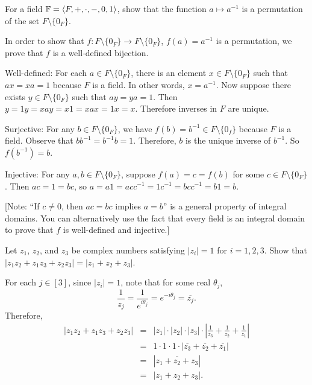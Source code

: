 \begin{problem}[Golan 12]
For a field $\mathbb{F} = \langle F,+,\cdot, -, 0, 1\rangle$, 
show that the function $a \mapsto a^{-1}$ is a 
permutation of the set $F \setminus \{0_F\}$.
\end{problem}
\smallskip
\begin{solution}

In order to show that $f:F\setminus \{0_F\}\rightarrow F\setminus \{0_F\}$, $f(a)=a^{-1}$ is a permutation, we prove that $f$ is a well-defined bijection. 

Well-defined: For each $a\in F\setminus \{0_F\}$, there is an element $x\in F\setminus \{0_F\}$ such that $ax=xa=1$ because $F$ is a field. In other words, $x=a^{-1}$. Now suppose there exists $y\in  F\setminus \{0_F\}$ such that $ay=ya=1$. Then $y = 1y = xay = x1 = xax = 1x = x$. Therefore inverses in $F$ are unique. 

Surjective: For any $b\in F\setminus \{0_F\}$, we have $f(b)=b^{-1}\in F\setminus \{0_f\}$ because $F$ is a field. Observe that $bb^{-1}=b^{-1}b=1$. Therefore, $b$ is the unique inverse of $b^{-1}$. So $f(b^{-1}) = b$. 

Injective: For any $a,b\in F\setminus \{0_F\}$, suppose $f(a) = c = f(b)$ for some $c\in F\setminus \{0_F\}$. Then $ac = 1 =bc $, so $a = a1 = acc^{-1} = 1c^{-1} = bcc^{-1} = b1 = b$.

[Note: ``If $c\neq 0$, then $ac = bc$ implies $a=b$'' is a general property of integral domains. You can alternatively use the fact that every field is an integral domain to prove that $f$ is well-defined and injective.]

\end{solution}
\probskip




\begin{problem}[Golan 16]
Let $z_1$, $z_2$, and $z_3$ be complex numbers satisfying 
$|z_i| = 1$ for $i = 1, 2, 3$. Show that 
$|z_1 z_2 + z_1 z_3 + z_2 z_3 | = |z_1 + z_2 + z_3|$.
\end{problem}
\smallskip
\begin{solution}
For each $j \in [3]$, since $|z_i|=1$, note that for some real $\theta_j$,
$$\frac{1}{z_j}  = \frac{1}{e^{i\theta_j}} = e^{-i\theta_j}= \overline{z_j}.$$
Therefore,
\begin{eqnarray*}
|z_1 z_2 + z_1 z_3 + z_2 z_3 | & = & |z_1| \cdot |z_2| \cdot |z_3| \cdot \left|\frac{1}{z_3} + \frac{1}{z_2} + \frac{1}{z_1}\right|\\
& = & 1 \cdot 1 \cdot 1 \cdot | \overline{z_3} + \overline{z_2} + \overline{z_1} | \\
& = &  | \overline{z_1 + z_2 + z_3} | \\
& = & |z_1 + z_2 + z_3 |.
\end{eqnarray*}

\end{solution}
\probskip





